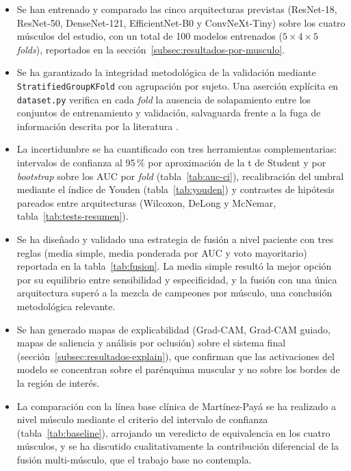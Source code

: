 \documentclass[12pt]{extarticle}
\numberwithin{equation}{section}
\begin{document}
\begin{refsection}
\begin{itemize}
    \item Se han entrenado y comparado las cinco arquitecturas previstas (ResNet-18, ResNet-50, DenseNet-121, EfficientNet-B0 y ConvNeXt-Tiny) sobre los cuatro músculos del estudio, con un total de 100 modelos entrenados ($5\times 4\times 5$ \textit{folds}), reportados en la sección~\ref{subsec:resultados-por-musculo}.
    \item Se ha garantizado la integridad metodológica de la validación mediante \texttt{Stratified\allowbreak Group\allowbreak KFold} con agrupación por sujeto. Una aserción explícita en \texttt{dataset.py} verifica en cada \textit{fold} la ausencia de solapamiento entre los conjuntos de entrenamiento y validación, salvaguarda frente a la fuga de información descrita por la literatura \cite{saeb2017need,roberts2021common}.
    \item La incertidumbre se ha cuantificado con tres herramientas complementarias: intervalos de confianza al 95\,\% por aproximación de la t de Student y por \textit{bootstrap} sobre los AUC por \textit{fold} (tabla~\ref{tab:auc-ci}), recalibración del umbral mediante el índice de Youden \cite{youden1950index} (tabla~\ref{tab:youden}) y contrastes de hipótesis pareados entre arquitecturas (Wilcoxon, DeLong y McNemar, tabla~\ref{tab:tests-resumen}).
    \item Se ha diseñado y validado una estrategia de fusión a nivel paciente con tres reglas (media simple, media ponderada por AUC y voto mayoritario) reportada en la tabla~\ref{tab:fusion}. La media simple resultó la mejor opción por su equilibrio entre sensibilidad y especificidad, y la fusión con una única arquitectura superó a la mezcla de campeones por músculo, una conclusión metodológica relevante.
    \item Se han generado mapas de explicabilidad (Grad-CAM, Grad-CAM guiado, mapas de saliencia y análisis por oclusión) sobre el sistema final (sección~\ref{subsec:resultados-explain}), que confirman que las activaciones del modelo se concentran sobre el parénquima muscular y no sobre los bordes de la región de interés.
    \item La comparación con la línea base clínica de Martínez-Payá \cite{martinezpaya2017quantitative} se ha realizado a nivel músculo mediante el criterio del intervalo de confianza (tabla~\ref{tab:baseline}), arrojando un veredicto de equivalencia en los cuatro músculos, y se ha discutido cualitativamente la contribución diferencial de la fusión multi-músculo, que el trabajo base no contempla.
\end{itemize}


\end{refsection}
\end{document}
